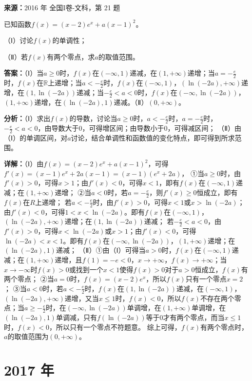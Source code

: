 \begin{question}[points=12]
\textbf{来源：}2016 年 全国I卷-文科，第 21 题\par
已知函数$f(x)=(x-2)e^x+a(x-1)^2$。

（Ⅰ）讨论$f(x)$的单调性；

（Ⅱ）若$f(x)$有两个零点，求$a$的取值范围。
\begin{solution}
\textbf{答案：}（Ⅰ）当$a\ge0$时，$f(x)$在$(-\infty,1)$递减，在$(1,+\infty)$递增；当$a=-\frac{e}{2}$时，$f(x)$在$\mathbb{R}$上递增；当$a<-\frac{e}{2}$时，$f(x)$在$(-\infty,1)$，$(\ln(-2a),+\infty)$递增，在$(1,\ln(-2a))$递减；当$-\frac{e}{2}<a<0$时，$f(x)$在$(-\infty,\ln(-2a))$，$(1,+\infty)$递增，在$(\ln(-2a),1)$递减。（Ⅱ）$(0,+\infty)$。

\textbf{分析：}（Ⅰ）求出$f(x)$的导数，讨论当$a\ge0$时，$a<-\frac{e}{2}$时，$a=-\frac{e}{2}$时，$-\frac{e}{2}<a<0$，由导数大于0，可得增区间；由导数小于0，可得减区间；
（Ⅱ）由（Ⅰ）的单调区间，对$a$讨论，结合单调性和函数值的变化特点，即可得到所求范围。

\textbf{详解：}（Ⅰ）由$f(x)=(x-2)e^x+a(x-1)^2$，可得$f'(x)=(x-1)e^x+2a(x-1)=(x-1)(e^x+2a)$，
①当$a\ge0$时，由$f'(x)>0$，可得$x>1$；由$f'(x)<0$，可得$x<1$，即有$f(x)$在$(-\infty,1)$递减；在$(1,+\infty)$递增；
②当$a<0$时，若$a=-\frac{e}{2}$，则$f'(x)\ge0$恒成立，即有$f(x)$在$R$上递增；
若$a<-\frac{e}{2}$时，由$f'(x)>0$，可得$x<1$或$x>\ln(-2a)$；由$f'(x)<0$，可得$1<x<\ln(-2a)$。即有$f(x)$在$(-\infty,1)$，$(\ln(-2a),+\infty)$递增；在$(1,\ln(-2a))$递减；
若$-\frac{e}{2}<a<0$，由$f'(x)>0$，可得$x<\ln(-2a)$或$x>1$；由$f'(x)<0$，可得$\ln(-2a)<x<1$。即有$f(x)$在$(-\infty,\ln(-2a))$，$(1,+\infty)$递增；在$(\ln(-2a),1)$递减；
（Ⅱ）①由（Ⅰ）可得当$a>0$时，$f(x)$在$(-\infty,1)$递减；在$(1,+\infty)$递增，且$f(1)=-e<0$，$x\to+\infty$，$f(x)\to+\infty$；当$x\to-\infty$时$f(x)>0$或找到一个$x<1$使得$f(x)>0$对于$a>0$恒成立，$f(x)$有两个零点；
②当$a=0$时，$f(x)=(x-2)e^x$，所以$f(x)$只有一个零点$x=2$；
③当$a<0$时，若$a<-\frac{e}{2}$时，$f(x)$在$(1,\ln(-2a))$递减，在$(-\infty,1)$，$(\ln(-2a),+\infty)$递增，又当$x\le1$时，$f(x)<0$，所以$f(x)$不存在两个零点；当$a\ge-\frac{e}{2}$时，在$(-\infty,\ln(-2a))$单调增，在$(1,+\infty)$单调增，在$(\ln(-2a),1)$单调减，只有$f(\ln(-2a))$等于0才有两个零点，而当$x\le1$时，$f(x)<0$，所以只有一个零点不符题意。
综上可得，$f(x)$有两个零点时，$a$的取值范围为$(0,+\infty)$。
\end{solution}
\end{question}

\section*{2017 年}


